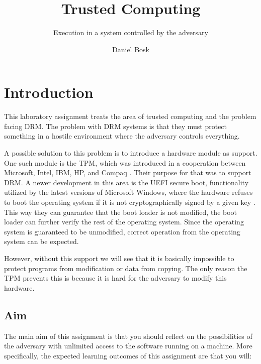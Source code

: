 \title{Trusted Computing}
\subtitle{Execution in a system controlled by the adversary}
\author{%
  Daniel Bosk
}
\maketitle

\section{Introduction}
\label{sec:intro}
This laboratory assignment treats the area of trusted computing and the problem 
facing \ac{DRM}.
The problem with \ac{DRM} systems is that they must protect something in 
a hostile environment where the adversary controls everything.

A possible solution to this problem is to introduce a hardware module as 
support.
One such module is the \ac{TPM}, which was introduced in a cooperation between 
Microsoft, Intel, IBM, HP, and Compaq \cite{Anderson2008sea}.
Their purpose for that was to support \ac{DRM}.
A newer development in this area is the UEFI secure boot, functionality 
utilized by the latest versions of Microsoft Windows, where the hardware 
refuses to boot the operating system if it is not cryptographically signed by 
a given key \cite{WinUEFIboot}.
This way they can guarantee that the boot loader is not modified, the boot 
loader can further verify the rest of the operating system.
Since the operating system is guaranteed to be unmodified, correct operation 
from the operating system can be expected.

However, without this support we will see that it is basically impossible to 
protect programs from modification or data from copying.
The only reason the \ac{TPM} prevents this is because it is hard for the 
adversary to modify this hardware.

\subsection{Aim}
\label{sec:aim}
The main aim of this assignment is that you should reflect on the possibilities 
of the adversary with unlimited access to the software running on a machine.
More specifically, the expected learning outcomes of this assignment are that 
you will:
\begin{itemize}
    
\end{itemize}

